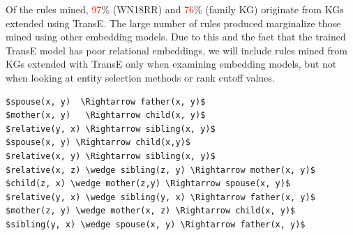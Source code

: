 Of the rules mined, \textcolor{red}{97}\% (WN18RR) and \textcolor{red}{76}\% (family KG) originate from KGs extended using TransE. The large number of rules produced marginalize those mined using other embedding models. Due to this and the fact that the trained TransE model has poor relational embeddings, we will include rules mined from KGs extended with TransE only when examining embedding models, but not when looking at entity selection methods or rank cutoff values.

\begin{lstlisting}[mathescape=true, float, caption={Selection of nonsense rules mined from KGs extended with TransE.},captionpos=b, label={TransE_nonsense_rules}]
$spouse(x, y)  \Rightarrow father(x, y)$
$mother(x, y)   \Rightarrow child(x, y)$
$relative(y, x) \Rightarrow sibling(x, y)$
$spouse(x, y) \Rightarrow child(x,y)$
$relative(x, y) \Rightarrow sibling(x, y)$
$relative(x, z) \wedge sibling(z, y) \Rightarrow mother(x, y)$
$child(z, x) \wedge mother(z,y) \Rightarrow spouse(x, y)$
$relative(y, x) \wedge sibling(y, x) \Rightarrow father(x, y)$
$mother(z, y) \wedge mother(x, z) \Rightarrow child(x, y)$
$sibling(y, x) \wedge spouse(x, y) \Rightarrow father(x, y)$
\end{lstlisting}





